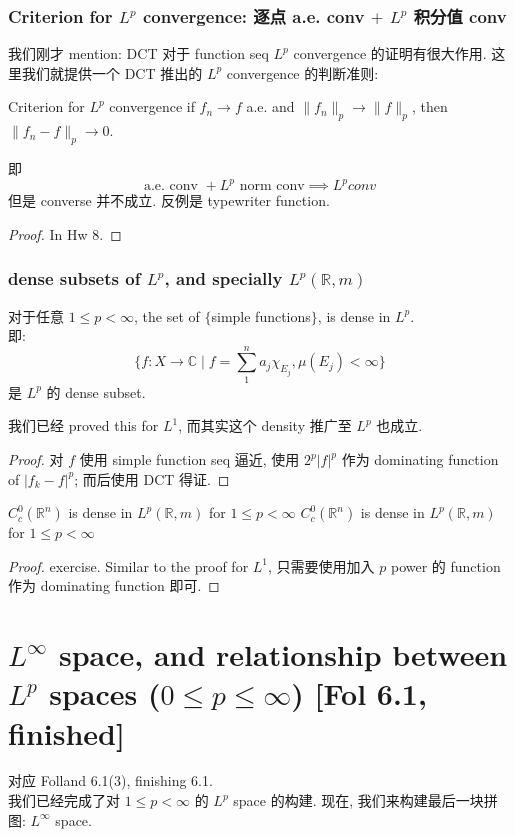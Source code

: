\documentclass[lang=cn,11pt]{elegantbook}
\begin{document}
\subsection{Criterion for $L^p$ convergence: 逐点 a.e. conv $+$ $L^p$ 积分值 conv}
我们刚才 mention: DCT 对于 function seq $L^p$ convergence 的证明有很大作用. 这里我们就提供一个 DCT 推出的 $L^p$ convergence 的判断准则: 
\begin{theorem}{Criterion for $L^p$ convergence}
    if $f_n\to f$ a.e. and $\|f_n\|_p\to\|f\|_p$, then $\|f_n-f\|_p\to0$. 
\end{theorem}
即 \[
\text{a.e. conv } + L^p\text{  norm conv} \implies L^p conv 
\]
但是 converse 并不成立. 反例是 typewriter function.
\begin{proof}
    In Hw 8.
\end{proof}



\subsection{dense subsets of $L^p$, and specially $L^p(\mathbb{R},m)$ }
\begin{proposition}
    对于任意 $1\leq p < \infty$, the set of $\{$simple functions$\}$, is dense in $L^p$.\\
    即: \[
    \{f:X \to \mathbb{C}\mid f=\sum_1^n  a_j \chi_{E_j},\mu(E_j)<\infty \}
    \]是 $L^p$ 的 dense subset.
\end{proposition}
\begin{remark}
    我们已经 proved this for $L^1$, 而其实这个 density 推广至 $L^p$ 也成立.
\end{remark}
\begin{proof}
对 $f$ 使用 simple function seq 逼近, 使用 $2^p |f|^p$ 作为 dominating function of $|f_k-f|^p$; 而后使用 DCT 得证.
\end{proof}

\begin{theorem}{$C_c^0(\mathbb{R}^n)$ is dense in $L^p(\mathbb{R},m)$ for $1\leq p < \infty$}
$C_c^0(\mathbb{R}^n)$ is dense in $L^p(\mathbb{R},m)$ for $1\leq p < \infty$
\end{theorem}
\begin{proof}
    exercise. Similar to the proof for $L^1$, 只需要使用加入 $p$ power 的 function 作为 dominating function 即可.
\end{proof}






\chapter{$L^\infty$ space, and relationship between $L^p$ spaces ($0\leq p \leq \infty$) [Fol 6.1, finished]}
对应 Folland 6.1(3), finishing 6.1.\\
我们已经完成了对 $1\leq p < \infty$ 的 $L^p$ space 的构建. 现在, 我们来构建最后一块拼图: $L^\infty$ space.
\end{document}
